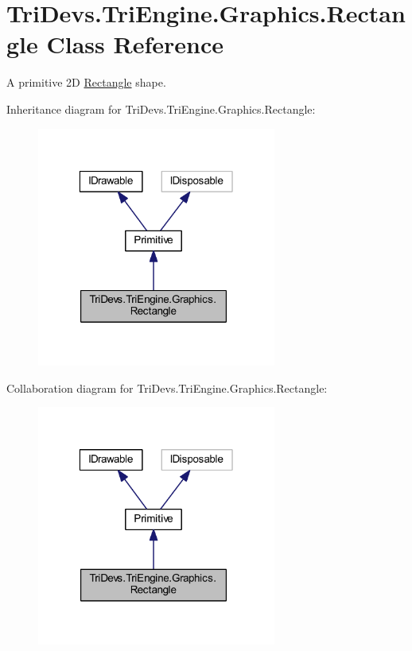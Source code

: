 \hypertarget{class_tri_devs_1_1_tri_engine_1_1_graphics_1_1_rectangle}{\section{Tri\-Devs.\-Tri\-Engine.\-Graphics.\-Rectangle Class Reference}
\label{class_tri_devs_1_1_tri_engine_1_1_graphics_1_1_rectangle}
}


A primitive 2\-D \hyperlink{class_tri_devs_1_1_tri_engine_1_1_graphics_1_1_rectangle}{Rectangle} shape.  




Inheritance diagram for Tri\-Devs.\-Tri\-Engine.\-Graphics.\-Rectangle\-:
\nopagebreak
\begin{figure}[H]
\begin{center}
\leavevmode
\includegraphics[width=223pt]{class_tri_devs_1_1_tri_engine_1_1_graphics_1_1_rectangle__inherit__graph}
\end{center}
\end{figure}


Collaboration diagram for Tri\-Devs.\-Tri\-Engine.\-Graphics.\-Rectangle\-:
\nopagebreak
\begin{figure}[H]
\begin{center}
\leavevmode
\includegraphics[width=223pt]{class_tri_devs_1_1_tri_engine_1_1_graphics_1_1_rectangle__coll__graph}
\end{center}
\end{figure}
